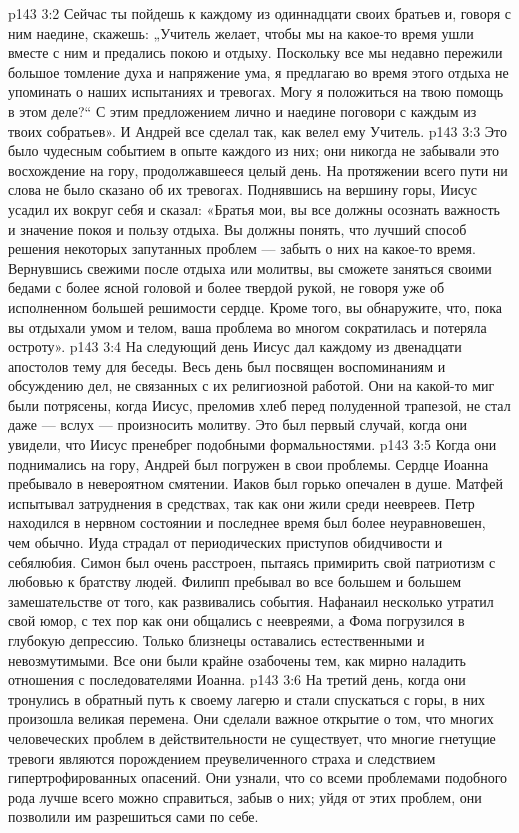 \vs p143 3:2 Сейчас ты пойдешь к каждому из одиннадцати своих братьев и, говоря с ним наедине, скажешь: „Учитель желает, чтобы мы на какое\hyp{}то время ушли вместе с ним и предались покою и отдыху. Поскольку все мы недавно пережили большое томление духа и напряжение ума, я предлагаю во время этого отдыха не упоминать о наших испытаниях и тревогах. Могу я положиться на твою помощь в этом деле?“ С этим предложением лично и наедине поговори с каждым из твоих собратьев». И Андрей все сделал так, как велел ему Учитель.
\vs p143 3:3 \pc Это было чудесным событием в опыте каждого из них; они никогда не забывали это восхождение на гору, продолжавшееся целый день. На протяжении всего пути ни слова не было сказано об их тревогах. Поднявшись на вершину горы, Иисус усадил их вокруг себя и сказал: «Братья мои, вы все должны осознать важность и значение покоя и пользу отдыха. Вы должны понять, что лучший способ решения некоторых запутанных проблем --- забыть о них на какое\hyp{}то время. Вернувшись свежими после отдыха или молитвы, вы сможете заняться своими бедами с более ясной головой и более твердой рукой, не говоря уже об исполненном большей решимости сердце. Кроме того, вы обнаружите, что, пока вы отдыхали умом и телом, ваша проблема во многом сократилась и потеряла остроту».
\vs p143 3:4 На следующий день Иисус дал каждому из двенадцати апостолов тему для беседы. Весь день был посвящен воспоминаниям и обсуждению дел, не связанных с их религиозной работой. Они на какой\hyp{}то миг были потрясены, когда Иисус, преломив хлеб перед полуденной трапезой, не стал даже --- вслух --- произносить молитву. Это был первый случай, когда они увидели, что Иисус пренебрег подобными формальностями.
\vs p143 3:5 Когда они поднимались на гору, Андрей был погружен в свои проблемы. Сердце Иоанна пребывало в невероятном смятении. Иаков был горько опечален в душе. Матфей испытывал затруднения в средствах, так как они жили среди неевреев. Петр находился в нервном состоянии и последнее время был более неуравновешен, чем обычно. Иуда страдал от периодических приступов обидчивости и себялюбия. Симон был очень расстроен, пытаясь примирить свой патриотизм с любовью к братству людей. Филипп пребывал во все большем и большем замешательстве от того, как развивались события. Нафанаил несколько утратил свой юмор, с тех пор как они общались с неевреями, а Фома погрузился в глубокую депрессию. Только близнецы оставались естественными и невозмутимыми. Все они были крайне озабочены тем, как мирно наладить отношения с последователями Иоанна.
\vs p143 3:6 На третий день, когда они тронулись в обратный путь к своему лагерю и стали спускаться с горы, в них произошла великая перемена. Они сделали важное открытие о том, что многих человеческих проблем в действительности не существует, что многие гнетущие тревоги являются порождением преувеличенного страха и следствием гипертрофированных опасений. Они узнали, что со всеми проблемами подобного рода лучше всего можно справиться, забыв о них; уйдя от этих проблем, они позволили им разрешиться сами по себе.
